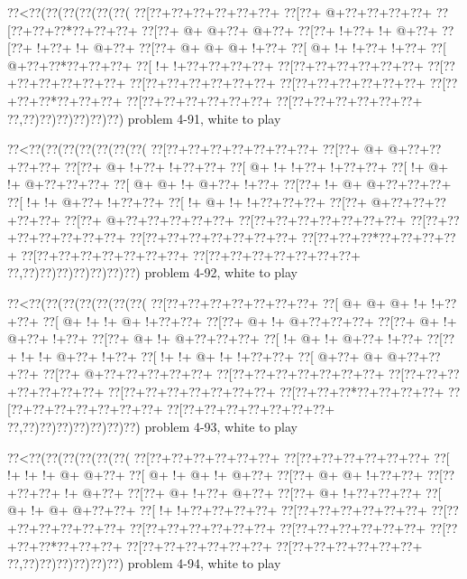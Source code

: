 \vbox{\vbox{\goo
\0??<\0??(\0??(\0??(\0??(\0??(\0??(
\0??[\0??+\0??+\0??+\0??+\0??+\0??+
\0??[\0??+\- @+\0??+\0??+\0??+\0??+
\0??[\0??+\0??+\0??*\0??+\0??+\0??+
\0??[\0??+\- @+\- @+\0??+\- @+\0??+
\0??[\0??+\- !+\0??+\- !+\- @+\0??+
\0??[\0??+\- !+\0??+\- !+\- @+\0??+
\0??[\0??+\- @+\- @+\- @+\- !+\0??+
\0??[\- @+\- !+\- !+\0??+\- !+\0??+
\0??[\- @+\0??+\0??*\0??+\0??+\0??+
\0??[\- !+\- !+\0??+\0??+\0??+\0??+
\0??[\0??+\0??+\0??+\0??+\0??+\0??+
\0??[\0??+\0??+\0??+\0??+\0??+\0??+
\0??[\0??+\0??+\0??+\0??+\0??+\0??+
\0??[\0??+\0??+\0??+\0??+\0??+\0??+
\0??[\0??+\0??+\0??*\0??+\0??+\0??+
\0??[\0??+\0??+\0??+\0??+\0??+\0??+
\0??[\0??+\0??+\0??+\0??+\0??+\0??+
\0??,\0??)\0??)\0??)\0??)\0??)\0??)
}
\hfil problem 4-91, white to play\hfil\break
}

\vbox{\vbox{\goo
\0??<\0??(\0??(\0??(\0??(\0??(\0??(\0??(
\0??[\0??+\0??+\0??+\0??+\0??+\0??+\0??+
\0??[\0??+\- @+\- @+\0??+\0??+\0??+\0??+
\0??[\0??+\- @+\- !+\0??+\- !+\0??+\0??+
\0??[\- @+\- !+\- !+\0??+\- !+\0??+\0??+
\0??[\- !+\- @+\- !+\- @+\0??+\0??+\0??+
\0??[\- @+\- @+\- !+\- @+\0??+\- !+\0??+
\0??[\0??+\- !+\- @+\- @+\0??+\0??+\0??+
\0??[\- !+\- !+\- @+\0??+\- !+\0??+\0??+
\0??[\- !+\- @+\- !+\- !+\0??+\0??+\0??+
\0??[\0??+\- @+\0??+\0??+\0??+\0??+\0??+
\0??[\0??+\- @+\0??+\0??+\0??+\0??+\0??+
\0??[\0??+\0??+\0??+\0??+\0??+\0??+\0??+
\0??[\0??+\0??+\0??+\0??+\0??+\0??+\0??+
\0??[\0??+\0??+\0??+\0??+\0??+\0??+\0??+
\0??[\0??+\0??+\0??*\0??+\0??+\0??+\0??+
\0??[\0??+\0??+\0??+\0??+\0??+\0??+\0??+
\0??[\0??+\0??+\0??+\0??+\0??+\0??+\0??+
\0??,\0??)\0??)\0??)\0??)\0??)\0??)\0??)
}
\hfil problem 4-92, white to play\hfil\break
}

\vbox{\vbox{\goo
\0??<\0??(\0??(\0??(\0??(\0??(\0??(\0??(
\0??[\0??+\0??+\0??+\0??+\0??+\0??+\0??+
\0??[\- @+\- @+\- @+\- !+\- !+\0??+\0??+
\0??[\- @+\- !+\- !+\- @+\- !+\0??+\0??+
\0??[\0??+\- @+\- !+\- @+\0??+\0??+\0??+
\0??[\0??+\- @+\- !+\- @+\0??+\- !+\0??+
\0??[\0??+\- @+\- !+\- @+\0??+\0??+\0??+
\0??[\- !+\- @+\- !+\- @+\0??+\- !+\0??+
\0??[\0??+\- !+\- !+\- @+\0??+\- !+\0??+
\0??[\- !+\- !+\- @+\- !+\- !+\0??+\0??+
\0??[\- @+\0??+\- @+\- @+\0??+\0??+\0??+
\0??[\0??+\- @+\0??+\0??+\0??+\0??+\0??+
\0??[\0??+\0??+\0??+\0??+\0??+\0??+\0??+
\0??[\0??+\0??+\0??+\0??+\0??+\0??+\0??+
\0??[\0??+\0??+\0??+\0??+\0??+\0??+\0??+
\0??[\0??+\0??+\0??*\0??+\0??+\0??+\0??+
\0??[\0??+\0??+\0??+\0??+\0??+\0??+\0??+
\0??[\0??+\0??+\0??+\0??+\0??+\0??+\0??+
\0??,\0??)\0??)\0??)\0??)\0??)\0??)\0??)
}
\hfil problem 4-93, white to play\hfil\break
}

\vbox{\vbox{\goo
\0??<\0??(\0??(\0??(\0??(\0??(\0??(
\0??[\0??+\0??+\0??+\0??+\0??+\0??+
\0??[\0??+\0??+\0??+\0??+\0??+\0??+
\0??[\- !+\- !+\- !+\- @+\- @+\0??+
\0??[\- @+\- !+\- @+\- !+\- @+\0??+
\0??[\0??+\- @+\- @+\- !+\0??+\0??+
\0??[\0??+\0??+\0??+\- !+\- @+\0??+
\0??[\0??+\- @+\- !+\0??+\- @+\0??+
\0??[\0??+\- @+\- !+\0??+\0??+\0??+
\0??[\- @+\- !+\- @+\- @+\0??+\0??+
\0??[\- !+\- !+\0??+\0??+\0??+\0??+
\0??[\0??+\0??+\0??+\0??+\0??+\0??+
\0??[\0??+\0??+\0??+\0??+\0??+\0??+
\0??[\0??+\0??+\0??+\0??+\0??+\0??+
\0??[\0??+\0??+\0??+\0??+\0??+\0??+
\0??[\0??+\0??+\0??*\0??+\0??+\0??+
\0??[\0??+\0??+\0??+\0??+\0??+\0??+
\0??[\0??+\0??+\0??+\0??+\0??+\0??+
\0??,\0??)\0??)\0??)\0??)\0??)\0??)
}
\hfil problem 4-94, white to play\hfil\break
}

